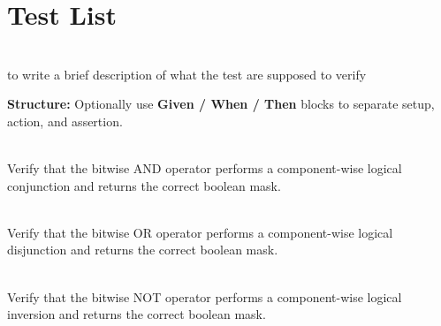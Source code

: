 \chapter{Test List }
\hypertarget{test}{}\label{test}

\begin{DoxyRefList}
\item[{\parbox[t]{\linewidth}{Page \doxylink{md__documentation_guideline}{Documentation Guideline for Falcon Game Math Library (FGM)} }}]\hfill \\
\label{test__test000001}%
%
to write a brief description of what the test are supposed to verify
\begin{DoxyItemize}
\item {\bfseries{Structure:\+}} Optionally use {\bfseries{Given /\+ When /\+ Then}} blocks to separate setup, action, and assertion.
\end{DoxyItemize}
\item[{\parbox[t]{\linewidth}{Member \doxylink{group___f_g_m___vec4___bool___bit_gacd4ef473404eadc0cd59c71d3a103015}{TEST\+\_\+F} (\doxylink{class_boolean_vector_bit_operations}{Boolean\+Vector\+Bit\+Operations}, Bitwise\+And\+Returns\+Componentwise\+And)}}]\hfill \\
\label{test__test000040}%
%
Verify that the  bitwise AND operator performs a component-\/wise logical conjunction and returns the correct boolean mask.  
\item[{\parbox[t]{\linewidth}{Member \doxylink{group___f_g_m___vec4___bool___bit_gab9cb0d090a03494b883411eb1c4b0eb5}{TEST\+\_\+F} (\doxylink{class_boolean_vector_bit_operations}{Boolean\+Vector\+Bit\+Operations}, Bitwise\+Or\+Returns\+Componentwise\+Or)}}]\hfill \\
\label{test__test000041}%
%
Verify that the  bitwise OR operator performs a component-\/wise logical disjunction and returns the correct boolean mask.  
\item[{\parbox[t]{\linewidth}{Member \doxylink{group___f_g_m___vec4___bool___bit_gac2022357fd31228b53cff0daded46f75}{TEST\+\_\+F} (\doxylink{class_boolean_vector_bit_operations}{Boolean\+Vector\+Bit\+Operations}, Bitwise\+Not\+Returns\+Inverted\+Vector)}}]\hfill \\
\label{test__test000042}%
%
Verify that the  bitwise NOT operator performs a component-\/wise logical inversion and returns the correct boolean mask.  

\end{DoxyRefList}
